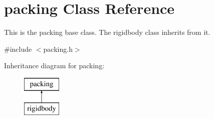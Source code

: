 \hypertarget{classpacking}{}\section{packing Class Reference}
\label{classpacking}


This is the packing base class. The rigidbody class inherits from it.  




{\ttfamily \#include $<$packing.\+h$>$}

Inheritance diagram for packing\+:\begin{figure}[H]
\begin{center}
\leavevmode
\includegraphics[height=2.000000cm]{classpacking}
\end{center}
\end{figure}

